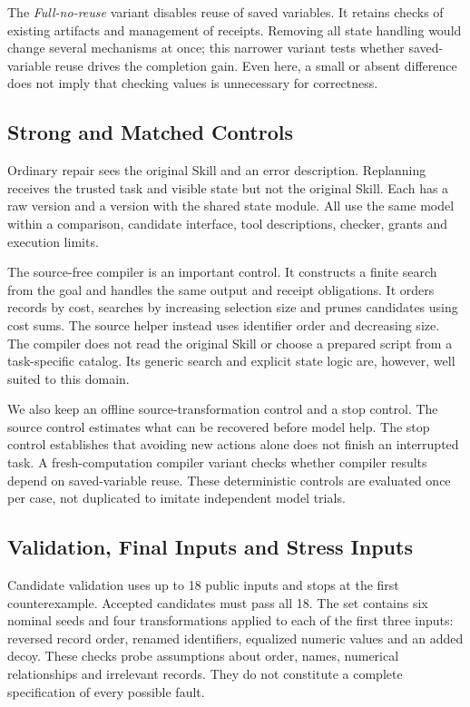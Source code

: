 \documentclass[conference]{IEEEtran}
\newcommand{\method}[1]{\textit{#1}}
\begin{document}
The \method{Full-no-reuse} variant disables reuse of saved variables. It retains checks of existing artifacts and management of receipts. Removing all state handling would change several mechanisms at once; this narrower variant tests whether saved-variable reuse drives the completion gain. Even here, a small or absent difference does not imply that checking values is unnecessary for correctness.

\subsection{Strong and Matched Controls}
Ordinary repair sees the original Skill and an error description. Replanning receives the trusted task and visible state but not the original Skill. Each has a raw version and a version with the shared state module. All use the same model within a comparison, candidate interface, tool descriptions, checker, grants and execution limits.

The source-free compiler is an important control. It constructs a finite search from the goal and handles the same output and receipt obligations. It orders records by cost, searches by increasing selection size and prunes candidates using cost sums. The source helper instead uses identifier order and decreasing size. The compiler does not read the original Skill or choose a prepared script from a task-specific catalog. Its generic search and explicit state logic are, however, well suited to this domain.

We also keep an offline source-transformation control and a stop control. The source control estimates what can be recovered before model help. The stop control establishes that avoiding new actions alone does not finish an interrupted task. A fresh-computation compiler variant checks whether compiler results depend on saved-variable reuse. These deterministic controls are evaluated once per case, not duplicated to imitate independent model trials.

\subsection{Validation, Final Inputs and Stress Inputs}
Candidate validation uses up to 18 public inputs and stops at the first counterexample. Accepted candidates must pass all 18. The set contains six nominal seeds and four transformations applied to each of the first three inputs: reversed record order, renamed identifiers, equalized numeric values and an added decoy. These checks probe assumptions about order, names, numerical relationships and irrelevant records. They do not constitute a complete specification of every possible fault.
\end{document}

